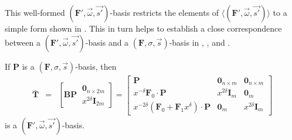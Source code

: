 This well-formed $(\mathbf{F}',\vec{\omega},\vec{s'})$-basis restricts
the elements of $\langle(\mathbf{F}',\vec{\omega},\vec{s'})\rangle$
to a simple form shown in . This in
turn helps to establish a close correspondence between a $(\mathbf{F}',\vec{\omega},\vec{s'})$-basis
and a $\left(\mathbf{F},\sigma,\vec{s}\right)$-basis in ,
, and . 
\begin{lem}
\label{lem:FtoAbasis}If $\mathbf{P}$ is a $\left(\mathbf{F},\sigma,\vec{s}\right)$-basis,
then 
\begin{eqnarray*}
\bar{\mathbf{T}} & = & \left[\mathbf{B}\mathbf{P}~\begin{array}{|c}
\mathbf{0}_{n\times2m}\\
x^{2\delta}\mathbf{I}_{2m}
\end{array}\right]=\left[\begin{array}{r|cc}
\mathbf{P} & \mathbf{0}_{n\times m} & \mathbf{0}_{n\times m}\\
\hline x^{-\delta}\mathbf{F}_{0}\cdot\mathbf{P} & x^{2\delta}\mathbf{I}_{m} & \mathbf{0}_{m}\\
x^{-2\delta}\left(\mathbf{F}_{0}+\mathbf{F}_{1}x^{\delta}\right)\cdot\mathbf{P} & \mathbf{0}_{m} & x^{2\delta}\mathbf{I}_{m}
\end{array}\right]
\end{eqnarray*}
 is a $(\mathbf{F}',\vec{\omega},\vec{s'})$-basis.\end{lem}
